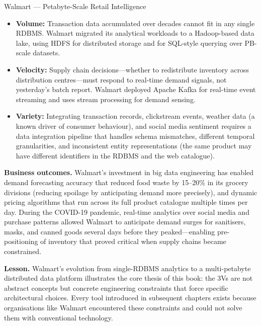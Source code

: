 \begin{casestudy}{Walmart --- Petabyte-Scale Retail Intelligence}
\begin{itemize}
  \item \textbf{Volume:} Transaction data accumulated over decades cannot
        fit in any single RDBMS. Walmart migrated its analytical
        workloads to a Hadoop-based data lake, using HDFS for distributed
        storage and  for SQL-style querying over PB-scale
        datasets.
  \item \textbf{Velocity:} Supply chain decisions---whether to redistribute
        inventory across distribution centres---must respond to real-time
        demand signals, not yesterday's batch report. Walmart deployed
        Apache Kafka for real-time event streaming and uses stream
        processing for demand sensing.
  \item \textbf{Variety:} Integrating transaction records, clickstream
        events, weather data (a known driver of consumer behaviour), and
        social media sentiment requires a data integration pipeline that
        handles schema mismatches, different temporal granularities, and
        inconsistent entity representations (the same product may have
        different identifiers in the RDBMS and the web catalogue).
\end{itemize}

\smallskip
\textbf{Business outcomes.}
Walmart's investment in big data engineering has enabled demand
forecasting accuracy that reduced food waste by 15--20\% in its grocery
divisions (reducing spoilage by anticipating demand more precisely), and
dynamic pricing algorithms that run across its full product catalogue
multiple times per day. During the COVID-19 pandemic, real-time analytics
over social media and purchase patterns allowed Walmart to anticipate
demand surges for sanitisers, masks, and canned goods several days before
they peaked---enabling pre-positioning of inventory that proved critical
when supply chains became constrained.

\smallskip
\textbf{Lesson.}
Walmart's evolution from single-RDBMS analytics to a multi-petabyte
distributed data platform illustrates the core thesis of this book: the
3Vs are not abstract concepts but concrete engineering constraints that
force specific architectural choices. Every tool introduced in subsequent
chapters exists because organisations like Walmart encountered these
constraints and could not solve them with conventional technology.
\end{casestudy}

